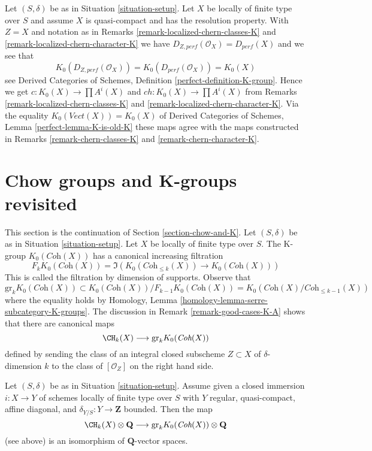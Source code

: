 \begin{remark}
\label{remark-chern-classes-agree}
Let $(S, \delta)$ be as in Situation \ref{situation-setup}.
Let $X$ be locally of finite type over $S$ and assume $X$
is quasi-compact and has the resolution property.
With $Z = X$ and notation as in
Remarks \ref{remark-localized-chern-classes-K} and
\ref{remark-localized-chern-character-K}
we have $D_{Z, perf}(\mathcal{O}_X) = D_{perf}(X)$
and we see that
$$
K_0(D_{Z, perf}(\mathcal{O}_X)) = K_0(D_{perf}(\mathcal{O}_X)) = K_0(X)
$$
see 
Derived Categories of Schemes, Definition \ref{perfect-definition-K-group}.
Hence we get
$c : K_0(X) \to \prod A^i(X)$ and $ch : K_0(X) \to \prod A^i(X)$ from
Remarks \ref{remark-localized-chern-classes-K} and
\ref{remark-localized-chern-character-K}.
Via the equality $K_0(\textit{Vect}(X)) = K_0(X)$ of
Derived Categories of Schemes, Lemma \ref{perfect-lemma-K-is-old-K}
these maps agree with the maps constructed in
Remarks \ref{remark-chern-classes-K} and
\ref{remark-chern-character-K}.
\end{remark}










\section{Chow groups and K-groups revisited}
\label{section-chow-and-K-II}

\noindent
This section is the continuation of Section \ref{section-chow-and-K}.
Let $(S, \delta)$ be as in Situation \ref{situation-setup}.
Let $X$ be locally of finite type over $S$. The K-group
$K_0(\textit{Coh}(X))$ has a canonical increasing filtration
$$
F_kK_0(\textit{Coh}(X)) =
\Im(K_0(\textit{Coh}_{\leq k}(X)) \to K_0(\textit{Coh}(X)))
$$
This is called the filtration by dimension of supports. Observe that
$$
\text{gr}_k K_0(\textit{Coh}(X)) \subset
K_0(\textit{Coh}(X))/F_{k - 1}K_0(\textit{Coh}(X)) =
K_0(\textit{Coh}(X)/\textit{Coh}_{\leq k - 1}(X))
$$
where the equality holds
by Homology, Lemma \ref{homology-lemma-serre-subcategory-K-groups}.
The discussion in Remark \ref{remark-good-cases-K-A} shows
that there are canonical maps
$$
\CH_k(X) \longrightarrow \text{gr}_k K_0(\textit{Coh}(X))
$$
defined by sending the class of an integral closed subscheme
$Z \subset X$ of $\delta$-dimension $k$ to the class of
$[\mathcal{O}_Z]$ on the right hand side.

\begin{proposition}
\label{proposition-K-tensor-Q}
Let $(S, \delta)$ be as in Situation \ref{situation-setup}. Assume given a
closed immersion $i : X \to Y$ of schemes locally of finite type over $S$
with $Y$ regular, quasi-compact, affine diagonal, and
$\delta_{Y/S} : Y \to \mathbf{Z}$ bounded. Then the map
$$
\CH_k(X) \otimes \mathbf{Q}
\longrightarrow
\text{gr}_k K_0(\textit{Coh}(X)) \otimes \mathbf{Q}
$$
(see above) is an isomorphism of $\mathbf{Q}$-vector spaces.
\end{proposition}

